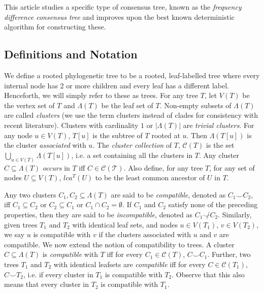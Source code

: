 \documentclass{article}
\newcommand{\compatible}{\smile}
\newcommand{\leafset}{\Lambda}
\begin{document}
    This article studies a specific type of consensus tree, known as the \textit{frequency difference consensus tree} \cite{goloboff2003improvements} and improves upon the best known deterministic algorithm for constructing these.

    \subsection{Definitions and Notation}
    We define a rooted phylogenetic tree to be a rooted, leaf-labelled tree where every internal node has 2 or more children and every leaf has a different label. Henceforth, we will simply refer to these as trees. For any tree $T$, let $V(T)$ be the vertex set of $T$ and $\leafset(T)$ be the leaf set of $T$. Non-empty subsets of $\leafset(T)$ are called \textit{clusters} (we use the term clusters instead of clades for consistency with recent literature). Clusters with cardinality $1$ or $|\leafset(T)|$ are \textit{trivial clusters}. For any node $u \in V(T)$, $T[u]$ is the subtree of $T$ rooted at $u$. Then $\leafset(T[u])$ is the cluster \textit{associated} with $u$. The \textit{cluster collection} of $T$, $\mathcal{C}(T)$ is the set $\bigcup_{u \in V(T)} {\leafset(T[u])}$, i.e. a set containing all the clusters in $T$. Any cluster $C \subseteq \leafset(T)$ \textit{occurs} in $T$ iff $C \in \mathcal{C(T)}$. Also define, for any tree $T$, for any set of nodes $U \subseteq V(T)$, $lca^T(U)$ to be the least common ancestor of $U$ in $T$.

    Any two clusters $C_1, C_2 \subseteq \leafset(T)$ are said to be \textit{compatible}, denoted as $C_1 \compatible C_2$, iff $C_1 \subseteq C_2$ or $C_2 \subseteq C_1$ or $C_1 \cap C_2 = \emptyset$. If $C_1$ and $C_2$ satisfy none of the preceding properties, then they are said to be \textit{incompatible}, denoted as $C_1 \not\compatible C_2$. Similarly, given trees $T_1$ and $T_2$ with identical leaf sets, and nodes $u \in V(T_1)$, $v \in V(T_2)$, we say $u$ is compatible with $v$ if the clusters associated with $u$ and $v$ are compatible. We now extend the notion of compatibility to trees. A cluster $C \subseteq \leafset(T)$ is \textit{compatible} with $T$ iff for every $C_1 \in \mathcal{C}(T)$, $C \compatible C_1$. Further, two trees $T_1$ and $T_2$ with identical leafsets are \textit{compatible} iff for every $C \in \mathcal{C}(T_1)$, $C \compatible T_2$, i.e. if every cluster in $T_1$ is compatible with $T_2$. Observe that this also means that every cluster in $T_2$ is compatible with $T_1$.
\end{document}
